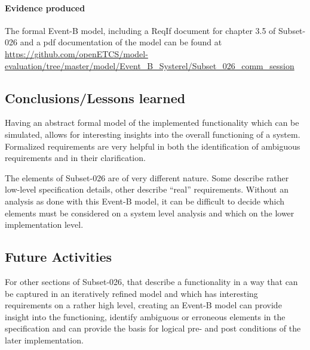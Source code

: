 \paragraph{Evidence produced}
\label{sec:evidence-produced}

The formal Event-B model, including a ReqIf document for chapter 3.5 of Subset-026
and a pdf documentation of the model can be found at
\url{https://github.com/openETCS/model-evaluation/tree/master/model/Event_B_Systerel/Subset_026_comm_session}

\subsection{Conclusions/Lessons learned}

Having an abstract formal model of the implemented functionality which can be
simulated, allows for interesting insights into the overall functioning of a
system. Formalized requirements are very helpful in both the identification of
ambiguous requirements and in their clarification.

The elements of Subset-026 are of very different nature. Some describe rather
low-level specification details, other describe ``real'' requirements. Without
an analysis as done with this Event-B model, it can be difficult to decide which
elements must be considered on a system level analysis and which on the lower
implementation level.


\subsection{Future Activities}
\label{sec:future-activities}

For other sections of Subset-026, that describe a functionality in a way that can be
captured in an iteratively refined model and which has interesting requirements
on a rather high level, creating an Event-B model can provide insight into the
functioning, identify ambiguous or erroneous elements in the specification and
can provide the basis for logical pre- and post conditions of the later
implementation.

